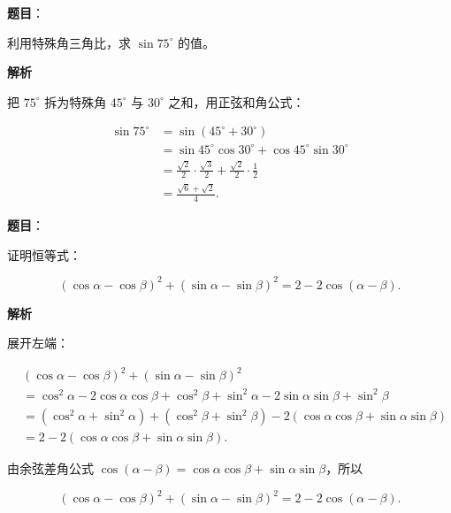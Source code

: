 \begin{answer}

\textbf{题目}：

利用特殊角三角比，求 $\sin75^\circ$ 的值。

\textbf{解析}

把 $75^\circ$ 拆为特殊角 $45^\circ$ 与 $30^\circ$ 之和，用正弦和角公式：

\nopagebreak[4]
\[
\begin{aligned}
\sin75^\circ
&=\sin(45^\circ+30^\circ)\\
&=\sin45^\circ\cos30^\circ+\cos45^\circ\sin30^\circ\\
&=\frac{\sqrt2}{2}\cdot\frac{\sqrt3}{2}+\frac{\sqrt2}{2}\cdot\frac12\\
&=\frac{\sqrt6+\sqrt2}{4}.
\end{aligned}
\]


\end{answer}
\begin{answer}

\textbf{题目}：

证明恒等式：

\nopagebreak[4]
\[
(\cos\alpha-\cos\beta)^2+(\sin\alpha-\sin\beta)^2=2-2\cos(\alpha-\beta).
\]

\textbf{解析}

展开左端：

\nopagebreak[4]
\[
\begin{aligned}
&(\cos\alpha-\cos\beta)^2+(\sin\alpha-\sin\beta)^2\\
&=\cos^2\alpha-2\cos\alpha\cos\beta+\cos^2\beta
+\sin^2\alpha-2\sin\alpha\sin\beta+\sin^2\beta\\
&=(\cos^2\alpha+\sin^2\alpha)+(\cos^2\beta+\sin^2\beta)
-2(\cos\alpha\cos\beta+\sin\alpha\sin\beta)\\
&=2-2(\cos\alpha\cos\beta+\sin\alpha\sin\beta).
\end{aligned}
\]

由余弦差角公式 $\cos(\alpha-\beta)=\cos\alpha\cos\beta+\sin\alpha\sin\beta$，所以

\nopagebreak[4]
\[
(\cos\alpha-\cos\beta)^2+(\sin\alpha-\sin\beta)^2=2-2\cos(\alpha-\beta).
\]


\end{answer}
